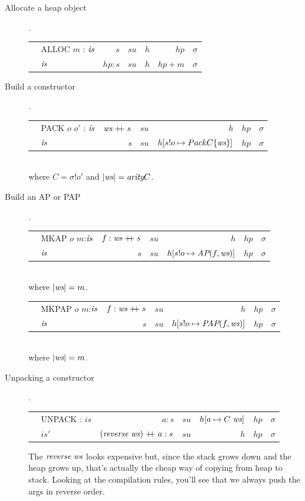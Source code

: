 \documentclass[11pt]{article}
\begin{document}
\begin{description}

\item[ Allocate a heap object ].

\begin{tabular}{|llrrrrr|}
\hline
	& ALLOC $m$ : $\mbox{\it is}$	& $s$    & $su$ & $h$ & $hp$   & $\sigma$ \\
\next	& $\mbox{\it is}$			& $hp:s$ & $su$ & $h$ & $hp+m$ & $\sigma$ \\
\hline
\end{tabular}

\item[ Build a constructor ].

\begin{tabular}{|llrrrrr|}
\hline
	& PACK $o$ $o'$ : $\mbox{\it is}$	& $\mbox{\it ws} \mathrel{+\mkern-6mu+} s$ 	& $su$ & $h$ 				& $hp$ & $\sigma$ \\
\next	& $\mbox{\it is}$			& $s$ 			& $su$ & $h[s!o \mapsto Pack C\{\mbox{\it ws}\}]$	& $hp$ & $\sigma$ \\
\hline
\end{tabular}
\\
where $C = \sigma!o'$ and ${\vert {\mbox{\it ws}} \vert} = {\mbox{\it arity}{C}}$.

\item[ Build an AP or  PAP ].

\begin{tabular}{|llrrrrr|}
\hline
	& MKAP $o$ $m$:$\mbox{\it is}$	& $f : \mbox{\it ws} \mathrel{+\mkern-6mu+} s$	& $su$ & $h$ 				& $hp$ & $\sigma$ \\
\next	& $\mbox{\it is}$			& $s$ 			& $su$ & $h[s!o \mapsto \mbox{\it AP}(f,\mbox{\it ws})]$ 	& $hp$ & $\sigma$ \\
\hline
\end{tabular}
\\
where ${\vert {\mbox{\it ws}} \vert} = m$.

\begin{tabular}{|llrrrrr|}
\hline
	& MKPAP $o$ $m$:$\mbox{\it is}$	& $f : \mbox{\it ws} \mathrel{+\mkern-6mu+} s$	& $su$ & $h$ 				& $hp$ & $\sigma$ \\
\next	& $\mbox{\it is}$			& $s$ 			& $su$ & $h[s!o \mapsto \mbox{\it PAP}(f,\mbox{\it ws})]$ 	& $hp$ & $\sigma$ \\
\hline
\end{tabular}
\\
where ${\vert {\mbox{\it ws}} \vert} = m$.

\item[ Unpacking a constructor ].

\begin{tabular}{|llrrrrr|}
\hline
	& UNPACK : $is$ 	& $a : s$ 				& $su$ & $h[a \mapsto C\ \ws]$  	& $hp$ & $\sigma$ \\
\next	& $is'$			& $(\reverse\ \ws) \append a : s$ 	& $su$ & $h$ 				& $hp$ & $\sigma$ \\
\hline
\end{tabular}

The $\mbox{\it reverse}\ \mbox{\it ws}$ looks expensive but, since the stack grows down
and the heap grows up, that's actually the cheap way of copying from
heap to stack.  Looking at the compilation rules, you'll see that we
always push the args in reverse order.

\end{description}
\end{document}
